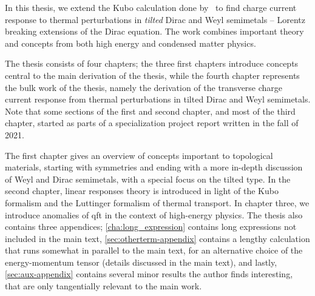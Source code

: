In this thesis, we extend the Kubo calculation done by~\textcite{arjonaFingerprintsConformalAnomaly2019} to find charge current response to thermal perturbations in \emph{tilted} Dirac and Weyl semimetals -- Lorentz breaking extensions of the Dirac equation.
The work combines important theory and concepts from both high energy and condensed matter physics.

The thesis consists of four chapters;
the three first chapters introduce concepts central to the main derivation of the thesis, while the fourth chapter represents the bulk work of the thesis, namely the derivation of the transverse charge current response from thermal perturbations in tilted Dirac and Weyl semimetals.
Note that some sections of the first and second chapter, and most of the third chapter, started as parts of a specialization project report written in the fall of 2021.

The first chapter gives an overview of concepts important to topological materials, starting with symmetries and ending with a more in-depth discussion of Weyl and Dirac semimetals, with a special focus on the tilted type.
In the second chapter, linear responses theory is introduced in light of the Kubo formalism and the Luttinger formalism of thermal transport.
In chapter three, we introduce anomalies of \gls{qft} in the context of high-energy physics.
The thesis also contains three appendices;
\cref{cha:long_expression} contains long expressions not included in the main text, \cref{sec:otherterm-appendix} contains a lengthy calculation that runs somewhat in parallel to the main text, for an alternative choice of the energy-momentum tensor (details discussed in the main text), and lastly, \cref{sec:aux-appendix} contains several minor results the author finds interesting, that are only tangentially relevant to the main work.


